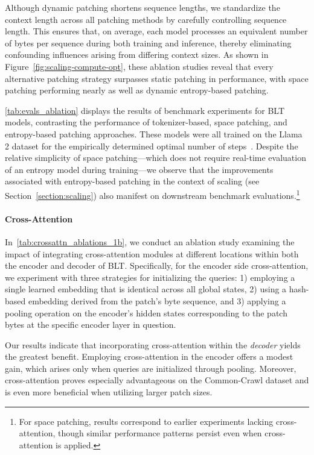 Although dynamic patching shortens sequence lengths, we standardize the context length across all patching methods by carefully controlling sequence length. This ensures that, on average, each model processes an equivalent number of bytes per sequence during both training and inference, thereby eliminating confounding influences arising from differing context sizes. As shown in Figure~\ref{fig:scaling-compute-opt}, these ablation studies reveal that every alternative patching strategy surpasses static patching in performance, with space patching performing nearly as well as dynamic entropy-based patching.

\autoref{tab:evals_ablation} displays the results of benchmark experiments for {\textsc BLT} models, contrasting the performance of tokenizer-based, space patching, and entropy-based patching approaches. These models were all trained on the Llama 2 dataset for the empirically determined optimal number of steps~\citep{dubey2024llama}. Despite the relative simplicity of space patching—which does not require real-time evaluation of an entropy model during training—we observe that the improvements associated with entropy-based patching in the context of scaling (see Section~\ref{section:scaling}) also manifest on downstream benchmark evaluations.\footnote{For space patching, results correspond to earlier experiments lacking cross-attention, though similar performance patterns persist even when cross-attention is applied.}

\paragraph{Cross-Attention} 
In~\autoref{tab:crossattn_ablations_1b}, we conduct an ablation study examining the impact of integrating cross-attention modules at different locations within both the encoder and decoder of {\textsc BLT}. Specifically, for the encoder side cross-attention, we experiment with three strategies for initializing the queries: 1) employing a single learned embedding that is identical across all global states, 2) using a hash-based embedding derived from the patch's byte sequence, and 3) applying a pooling operation on the encoder’s hidden states corresponding to the patch bytes at the specific encoder layer in question.

Our results indicate that incorporating cross-attention within the \textit{decoder} yields the greatest benefit. Employing cross-attention in the encoder offers a modest gain, which arises only when queries are initialized through pooling. Moreover, cross-attention proves especially advantageous on the Common-Crawl dataset and is even more beneficial when utilizing larger patch sizes.

